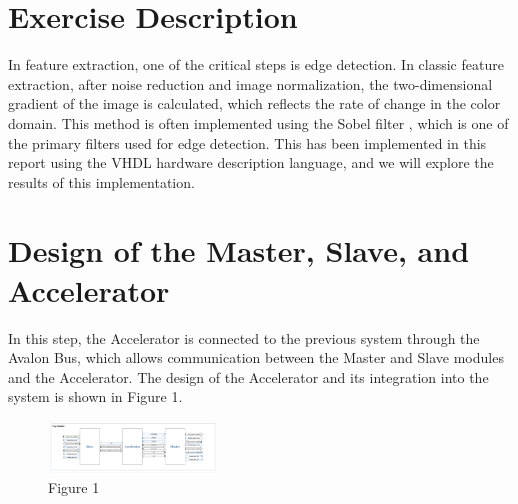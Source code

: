 \documentclass[DIV=calc, paper=a4, fontsize=11pt, twocolumn]{scrartcl}	 %
\begin{document}
\section*{\small{Exercise Description}}


In feature extraction, one of the critical steps is edge detection. 
In classic feature extraction, after noise reduction and image normalization, 
the two-dimensional gradient of the image is calculated, which reflects the rate 
of change in the color domain. This method is often implemented using the Sobel filter
, which is one of the primary filters used for edge detection. This has been 
implemented in this report using the VHDL hardware description language, and we will 
explore the results of this implementation.



\section*{\small{Design of the Master, Slave, and Accelerator}}


In this step, the Accelerator is connected to the previous system through the Avalon Bus, 
which allows communication between the Master and Slave modules and the Accelerator. 
The design of the Accelerator and its integration into the system is shown in Figure 1.

\begin{figure}[htbp]
  \centering
  \includegraphics[width=0.4\textwidth]{Master_Slave_Diagram.pdf}
  \caption{Figure 1}
  \label{fig:visio-diagram}
\end{figure}

\end{document}
